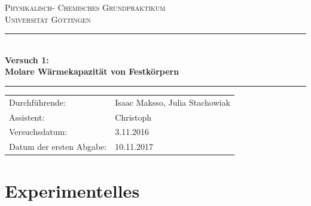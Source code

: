 \documentclass[12pt,a4paper,titlepage,headinclude,bibtotoc]{scrartcl}
\begin{document}
\begin{titlepage}
\centering
\textsc{\Large Physikalisch- Chemisches Grundpraktikum\\[1.5ex] Universität Göttingen}

\vspace*{0.5cm}

\rule{\textwidth}{1pt}\\[0.5cm]
{\huge \bfseries
  Versuch 1: \\[1.5ex]
  Molare Wärmekapazität von Festkörpern }\\[0.5cm]
\rule{\textwidth}{1pt}

\vspace*{0.5cm}


\begin{Large}
\begin{tabular}{ll}
Durchführende: &  Isaac Maksso, Julia Stachowiak\\
Assistent: & Christoph \\
 Versuchsdatum: & 3.11.2016\\
 Datum der ersten Abgabe: & 10.11.2017\\
\end{tabular}
\end{Large}

\vspace*{0.5cm}

\begin{Large}
\end{Large}
\end{titlepage}


\tableofcontents

\newpage


\section{Experimentelles}
\end{document}
